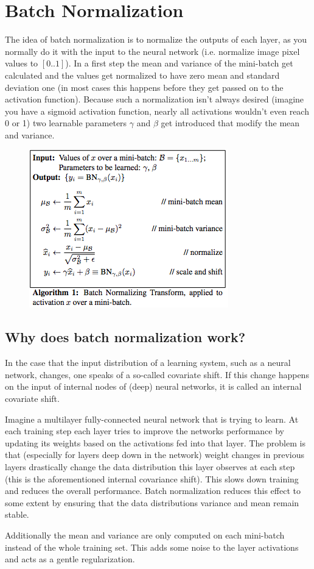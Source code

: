 \documentclass{scrartcl}
\begin{document}
\section{Batch Normalization}
The idea of batch normalization is to normalize the outputs of each layer, as you normally do it with the input to the neural network (i.e. normalize image pixel values to $[0..1]$). In a first step the mean and variance of the mini-batch get calculated and the values get normalized to have zero mean and standard deviation one (in most cases this happens before they get passed on to the activation function). Because such a normalization isn't always desired (imagine you have a sigmoid activation function, nearly all activations wouldn't even reach 0 or 1) two learnable parameters $\gamma$ and $\beta$ get introduced that modify the mean and variance.
\begin{figure}
	\centering
		\includegraphics[scale=0.7]{img/batch_norm}
	\caption{}
	\label{fig:batch_norm}
\end{figure}

\subsection{Why does batch normalization work?}
In the case that the input distribution of a learning system, such as a neural network, changes, one speaks of a so-called covariate shift. If this change happens on the input of internal nodes of (deep) neural networks, it is called an internal covariate shift.

Imagine a multilayer fully-connected neural network that is trying to learn. At each training step each layer tries to improve the networks performance by updating its weights based on the activations fed into that layer. The problem is that (especially for layers deep down in the network) weight changes in previous layers drastically change the data distribution this layer observes at each step (this is the aforementioned internal covariance shift). This slows down training and reduces the overall performance. Batch normalization reduces this effect to some extent by ensuring that the data distributions variance and mean remain stable.

Additionally the mean and variance are only computed on each mini-batch instead of the whole training set. This adds some noise to the layer activations and acts as a gentle regularization.
\newpage


\end{document}
